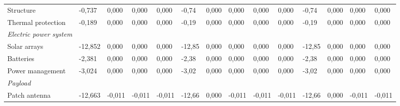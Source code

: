\begin{landscape}
\begin{table}[]
{\begin{tabular}{| l | l | l | l | l | l | l | l | l | l | l | l | l | l |}
Structure                                                                              & -0,737           & 0,000           & 0,000           & 0,000           & -0,74           & 0,000           & 0,000           & 0,000           & 0,000           & -0,74           & 0,000            & 0,000            & 0,000            \\
Thermal protection                                                                     & -0,189           & 0,000           & 0,000           & 0,000           & -0,19           & 0,000           & 0,000           & 0,000           & 0,000           & -0,19           & 0,000            & 0,000            & 0,000            \\
\textit{Electric power system}                                                         &                  &                 &                 &                 &                 &                 &                 &                 &                 &                 &                  &                  &                  \\
Solar arrays                                                                           & -12,852          & 0,000           & 0,000           & 0,000           & -12,85          & 0,000           & 0,000           & 0,000           & 0,000           & -12,85          & 0,000            & 0,000            & 0,000            \\
Batteries                                                                              & -2,381           & 0,000           & 0,000           & 0,000           & -2,38           & 0,000           & 0,000           & 0,000           & 0,000           & -2,38           & 0,000            & 0,000            & 0,000            \\
Power management                                                                       & -3,024           & 0,000           & 0,000           & 0,000           & -3,02           & 0,000           & 0,000           & 0,000           & 0,000           & -3,02           & 0,000            & 0,000            & 0,000            \\
\textit{Payload}                                                                       &                  &                 &                 &                 &                 &                 &                 &                 &                 &                 &                  &                  &                  \\
Patch antenna                                                                          & -12,663          & -0,011          & -0,011          & -0,011          & -12,66          & 0,000           & -0,011          & -0,011          & -0,011          & -12,66          & 0,000            & -0,011           & -0,011           \\

\end{tabular}}
\end{table}
\end{landscape}
